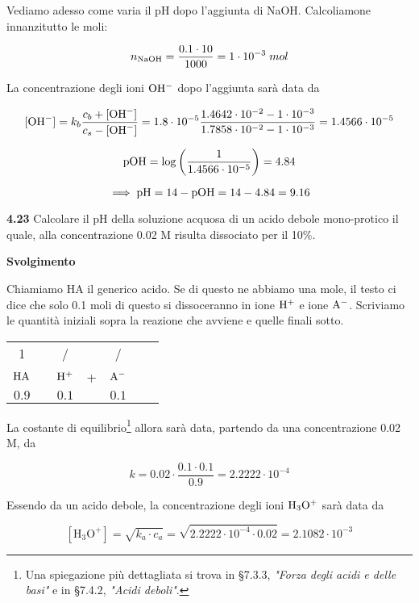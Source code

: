 Vediamo adesso come varia il pH dopo l'aggiunta di NaOH. Calcoliamone innanzitutto le moli:

$$n_{\rm NaOH}=\frac{0.1 \cdot 10}{1000}=1 \cdot 10^{-3}\;mol$$

La concentrazione degli ioni $\rm OH^-$ dopo l'aggiunta sarà data da

$${[\text{OH}^-]}=k_b \frac{c_b + {[\text{OH}^-]}}{c_s - \rm{[\text{OH}^-]}}
=1.8 \cdot 10^{-5}\frac{1.4642 \cdot 10^{-2} - 1 \cdot 10^{-3}}{1.7858 \cdot 10^{-2} - 1 \cdot 10^{-3}}=1.4566 \cdot 10^{-5}$$

$$\rm pOH=\log \left( \frac{1}{1.4566 \cdot 10^{-5}} \right)=4.84$$

$$\implies \rm pH=14-pOH=14-4.84=9.16$$

\vspace{0.2cm}\textbf{4.23} Calcolare il pH della soluzione acquosa di un acido debole mono-protico il quale, alla concentrazione 0.02 M risulta dissociato per il 10\%.

\vspace{0.2cm}\large\textbf{Svolgimento}\normalsize

\vspace{0.2cm} Chiamiamo HA il generico acido. Se di questo ne abbiamo una mole, il testo ci dice che solo 0.1 moli di questo si dissoceranno in ione $\rm H^+$ e ione $\rm A^-$. Scriviamo le quantità iniziali sopra la reazione che avviene e quelle finali sotto.

\begin{center}
    \begin{tabular}{ccccccc}
        1 & & / & & /\\
        $\rm HA$ & \ce{<-->} & $\rm H^+$ & + & $\rm A^-$\\
        $0.9$ & & $0.1$ & & $0.1$\\
    \end{tabular}
\end{center}

La costante di equilibrio\footnote{Una spiegazione più dettagliata si trova in §7.3.3, \textit{"Forza degli acidi e delle basi"} e in §7.4.2, \textit{"Acidi deboli"}.} allora sarà data, partendo da una concentrazione 0.02 M, da

$$k=0.02 \cdot \frac{0.1 \cdot 0.1}{0.9}=2.2222 \cdot 10^{-4}$$

Essendo da un acido debole, la concentrazione degli ioni $\rm H_3O^+$ sarà data da

$$[\text{H}_3\text{O}^+] = \sqrt{k_a \cdot c_a}
=\sqrt{2.2222 \cdot 10^{-4} \cdot 0.02}=2.1082 \cdot 10^{-3}$$


